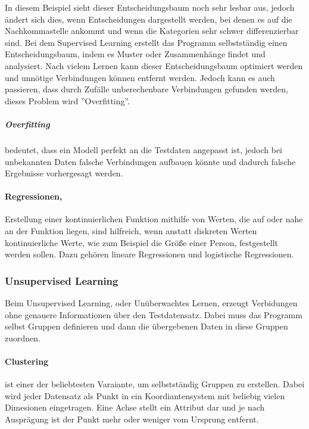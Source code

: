 In diesem Beispiel sieht dieser Entscheidungsbaum noch sehr lesbar aus, jedoch ändert sich dies, wenn Entscheidungen dargestellt werden, bei denen es auf die Nachkommastelle ankommt und wenn die Kategorien sehr schwer differenzierbar sind. Bei dem Supervised Learning erstellt das Programm selbstständig einen Entscheidungsbaum, indem es Muster oder Zusammenhänge findet und analysiert. Nach vielem Lernen kann dieser Entscheidungsbaum optimiert werden und unnötige Verbindungen können entfernt werden. Jedoch kann es auch passieren, dass durch Zufälle unberechenbare Verbindungen gefunden werden, dieses Problem wird ''Overfitting''. 

\subparagraph{Overfitting} bedeutet, dass ein Modell perfekt an die Testdaten angepasst ist, jedoch bei unbekannten Daten falsche Verbindungen aufbauen könnte und dadurch falsche Ergebnisse vorhergesagt werden. 

\paragraph{Regressionen,} Erstellung einer kontinuierlichen Funktion mithilfe von Werten, die auf oder nahe an der Funktion liegen, sind hilfreich, wenn anstatt diskreten Werten kontinuierliche Werte, wie zum Beispiel die Größe einer Person, festgestellt werden sollen. Dazu gehören lineare Regressionen und logistische Regressionen.

\subsubsection{Unsupervised Learning}

Beim Unsupervised Learning, oder Unüberwachtes Lernen, erzeugt Verbidungen ohne genauere Informationen über den Testdatensatz. Dabei muss das Programm selbst Gruppen definieren und dann die übergebenen Daten in diese Gruppen zuordnen.

\paragraph{Clustering} ist einer der beliebtesten Varaiante, um selbstständig Gruppen zu erstellen. Dabei wird jeder Datensatz als Punkt in ein Koordiantensystem mit beliebig vielen Dimesionen eingetragen. Eine Achse stellt ein Attribut dar und je nach Ausprägung ist der Punkt mehr oder weniger vom Ursprung entfernt. 

